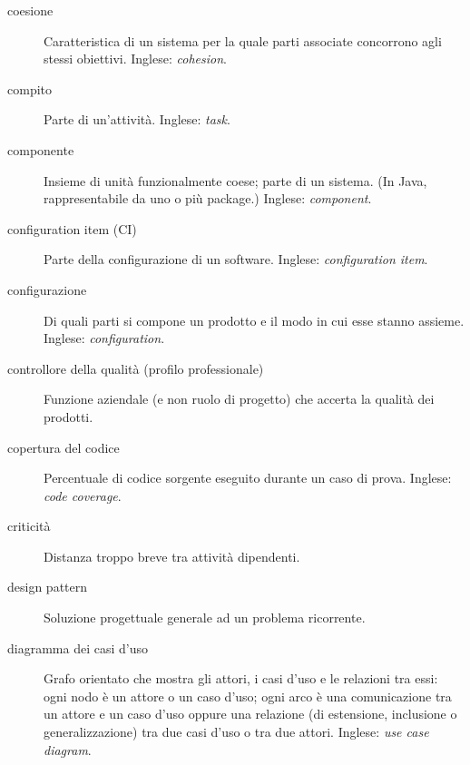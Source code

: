 \documentclass[a4paper]{article}
\begin{document}
\begin{description}
	\item[coesione] 

			Caratteristica di un sistema per la quale parti associate concorrono agli stessi obiettivi. Inglese: \emph{cohesion}.
			
	\item[compito] 

			Parte di un'attività. Inglese: \emph{task}.
			
	\item[componente] 

			Insieme di unità funzionalmente coese; parte di un sistema. (In Java, rappresentabile da uno o più package.) Inglese: \emph{component}.
			
	\item[configuration item (CI)] 

			Parte della configurazione di un software. Inglese: \emph{configuration item}.
			
	\item[configurazione] 

			Di quali parti si compone un prodotto e il modo in cui esse stanno assieme. Inglese: \emph{configuration}.
			
	\item[controllore della qualità (profilo professionale)] 

			Funzione aziendale (e non ruolo di progetto) che accerta la qualità dei prodotti.
			
	\item[copertura del codice] 

			Percentuale di codice sorgente eseguito durante un caso di prova. Inglese: \emph{code coverage}.
			
	\item[criticità] 

			Distanza troppo breve tra attività dipendenti.
			
	\item[design pattern] 

			Soluzione progettuale generale ad un problema ricorrente.
			
	\item[diagramma dei casi d'uso] 

			Grafo orientato che mostra gli attori, i casi d'uso e le relazioni tra essi: ogni nodo è un attore o un caso d'uso; ogni arco è una comunicazione tra un attore e un caso d'uso oppure una relazione (di estensione, inclusione o generalizzazione) tra due casi d'uso o tra due attori. Inglese: \emph{use case diagram}.
			

\end{description}
\end{document}
